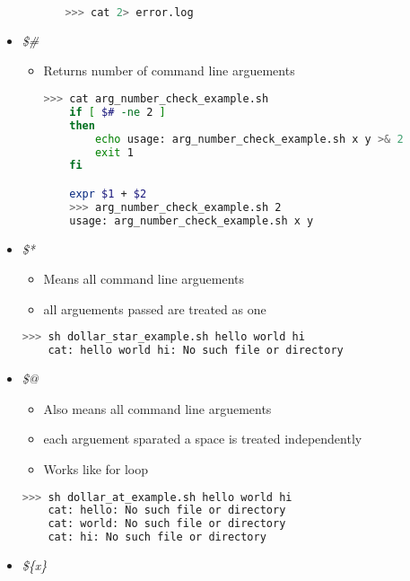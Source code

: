 \documentclass[12pt]{article}
\begin{document}
\begin{itemize}
\begin{itemize}
\begin{itemize}
    \begin{lstlisting}[language=bash]
    >>> cat 2> error.log
    \end{lstlisting}
    \end{itemize}

    \end{itemize}
    \item \textit{\$\#}
    \begin{itemize}
    \item Returns number of command line arguements

    \begin{lstlisting}[language=bash]
    >>> cat arg_number_check_example.sh
    if [ $# -ne 2 ]
    then
        echo usage: arg_number_check_example.sh x y >& 2
        exit 1
    fi

    expr $1 + $2
    >>> arg_number_check_example.sh 2
    usage: arg_number_check_example.sh x y
    \end{lstlisting}

    \end{itemize}
    \item \textit{\$*}
    \begin{itemize}
    \item Means all command line arguements
    \item all arguements passed are treated as one
    \end{itemize}

    \begin{lstlisting}[language=bash]
    >>> sh dollar_star_example.sh hello world hi
    cat: hello world hi: No such file or directory
    \end{lstlisting}

    \item \textit{\$@}
    \begin{itemize}
    \item Also means all command line arguements
    \item each arguement sparated a space is treated independently
    \item Works like for loop
    \end{itemize}
    \begin{lstlisting}[language=bash]
    >>> sh dollar_at_example.sh hello world hi
    cat: hello: No such file or directory
    cat: world: No such file or directory
    cat: hi: No such file or directory
    \end{lstlisting}

    \item \textit{\$\{x\}}
\end{itemize}
\end{document}
